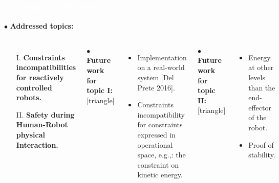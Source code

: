 \begin{frame}[noframenumbering]
\frametitle{{\textcolor{white}{\hspace{0.3cm}Conclusion -- future work}}}
\hspace{-6mm}
$\bullet$ {\color{blue-violet}\textbf{Addressed topics:}}
\begin{columns}
\column{\paperwidth-10mm}
\begin{itemize}
\item[I.]  {\color{red}\textbf{Constraints incompatibilities for reactively controlled robots.}}
\item[II.] {\color{red}\textbf{Safety during Human-Robot physical Interaction.}}
\end{itemize}
\vspace{3mm}
$\bullet$ {\color{ao(english)}\textbf{Future work for topic I:}}
[triangle] 
\begin{itemize}
\item Implementation on a real-world system [Del Prete 2016].
\item Constraints incompatibility for constraints expressed in operational space, e.g.,: the constraint on kinetic energy.
\end{itemize}
\vspace{5mm}
$\bullet$ {\color{ao(english)}\textbf{Future work for topic II:}}
[triangle] 
\begin{itemize}
\item Energy at other levels than the end-effector of the robot.
\item Proof of stability.
\end{itemize}
\end{columns}
\end{frame}








